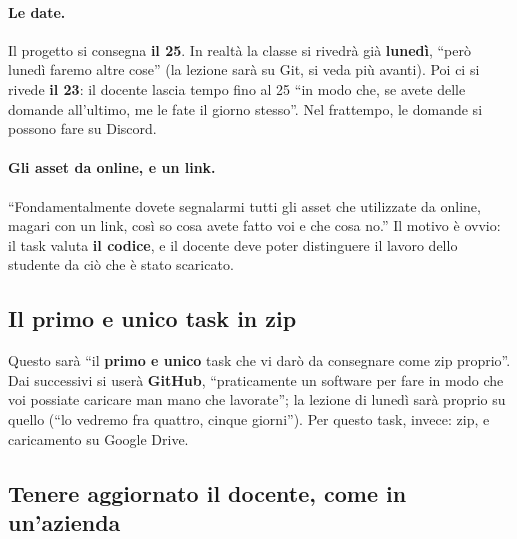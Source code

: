 \paragraph{Le date.} Il progetto si consegna \textbf{il 25}. In realtà la
classe si rivedrà già \textbf{lunedì}, ``però lunedì faremo altre cose''
(la lezione sarà su Git, si veda più avanti). Poi ci si rivede \textbf{il 23}:
il docente lascia tempo fino al 25 ``in modo che, se avete delle domande
all'ultimo, me le fate il giorno stesso''. Nel frattempo, le domande si possono
fare su Discord.

\paragraph{Gli asset da online, e un link.} ``Fondamentalmente dovete
segnalarmi tutti gli asset che utilizzate da online, magari con un link, così
so cosa avete fatto voi e che cosa no.'' Il motivo è ovvio: il task valuta
\textbf{il codice}, e il docente deve poter distinguere il lavoro dello studente
da ciò che è stato scaricato.

\subsection{Il primo e unico task in zip}

Questo sarà ``il \textbf{primo e unico} task che vi darò da consegnare come zip
proprio''. Dai successivi si userà \textbf{GitHub}, ``praticamente un software
per fare in modo che voi possiate caricare man mano che lavorate''; la lezione
di lunedì sarà proprio su quello (``lo vedremo fra quattro, cinque giorni''). Per
questo task, invece: zip, e caricamento su Google Drive.

\subsection{Tenere aggiornato il docente, come in un'azienda}

